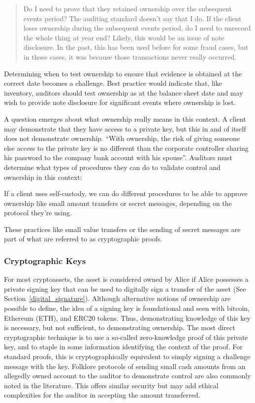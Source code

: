 \begin{quote}
Do I need to prove that they retained ownership over the subsequent events period? The auditing standard doesn't say that I do. If the client loses ownership during the subsequent events period, do I need to unrecord the whole thing at year end? Likely, this would be an issue of note disclosure. In the past, this has been used before for some fraud cases, but in those cases, it was because those transactions never really occurred.
\end{quote}

Determining when to test ownership to ensure that evidence is obtained at the correct date becomes a challenge. Best practice would indicate that, like inventory, auditors should test ownership as at the balance sheet date and may wish to provide note disclosure for significant events where ownership is lost. 

A question emerges about what ownership really means in this context. A client may demonstrate that they have access to a private key, but this in and of itself does not demonstrate ownership. ``With ownership, the risk of giving someone else access to the private key is no different than the corporate controller sharing his password to the company bank account with his spouse''. Auditors must determine what types of procedures they can do to validate control and ownership in this context: 

If a client uses self-custody, we can do different procedures to be able to approve ownership like small amount transfers or secret messages, depending on the protocol they're using. 

These practices like small value transfers or the sending of secret messages are part of what are referred to as cryptographic proofs. 

\subsubsection{Cryptographic Keys} 

For most cryptoassets, the asset is considered owned by Alice if Alice possesses a private signing key that can be used to digitally sign a transfer of the asset (See Section~\ref{digital_signature}). Although alternative notions of ownership are possible to define, the idea of a signing key is foundational and seen with bitcoin, Ethereum (ETH), and ERC20 tokens. Thus, demonstrating knowledge of this key is necessary, but not sufficient, to demonstrating ownership. The most direct cryptographic technique is to use a so-called zero-knowledge proof of this private key, and to staple in some information identifying the context of the proof. For standard proofs, this is cryptographically equivalent to simply signing a challenge message with the key. Folklore protocols of sending small cash amounts from an allegedly owned account to the auditor to demonstrate control are also commonly noted in the literature. This offers similar security but may add ethical complexities for the auditor in accepting the amount transferred. 

